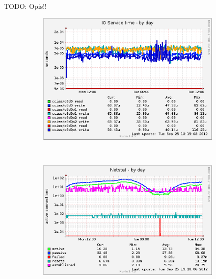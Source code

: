 \documentclass[10pt,a4paper]{article}
\newcommand{\todo}[1]{\noindent\colorbox{myRed}{TODO: #1}}
\begin{document}
\todo{Opis!!}

\begin{figure}
        \centering
        \begin{subfigure}[b]{0.49\textwidth}
                \centering
                \includegraphics[width=\textwidth]{iostat_ios-day}
                \label{fig:iostat_ios-day}
        \end{subfigure}%
        ~ %
        \begin{subfigure}[b]{0.49\textwidth}
                \centering
                \includegraphics[width=\textwidth]{netstat-day}
                \label{fig:netstat-day}
        \end{subfigure}
        
        \label{fig:animals}
\end{figure}
\end{document}
